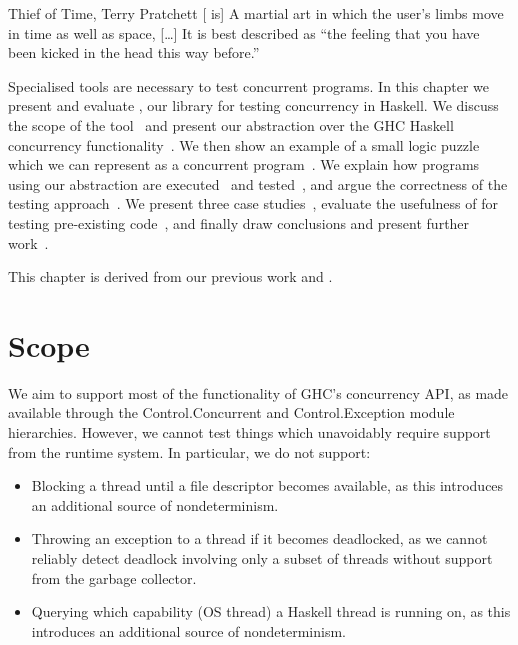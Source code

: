 \begin{bquote}{Thief of Time, Terry Pratchett\nocite{pratchett2001}}
  {[}\dejafu{} is] A martial art in which the user's limbs move in time
  as well as space, [\ldots] It is best described as ``the feeling
  that you have been kicked in the head this way before.''
\end{bquote}

\noindent
Specialised tools are necessary to test concurrent programs.  In this
chapter we present and evaluate \dejafu{}, our library for testing
concurrency in Haskell.  We discuss the scope of the
tool~ and present our abstraction over the GHC
Haskell concurrency functionality~.  We then
show an example of a small logic puzzle which we can represent as a
concurrent program~.  We explain how programs using
our abstraction are executed~ and
tested~, and argue the correctness of the testing
approach~.  We present three case
studies~, evaluate the usefulness of
\dejafu{} for testing pre-existing code~, and
finally draw conclusions and present further
work~.

This chapter is derived from our previous work \cite{YCS-2016-503} and
\cite{walker2015}.

\section{Scope}
\label{sec:dejafu-scope}

We aim to support most of the functionality of GHC’s concurrency API,
as made available through the Control.Concurrent and Control.Exception
module hierarchies.  However, we cannot test things which unavoidably
require support from the runtime system.  In particular, we do not
support:

\begin{itemize}
\item Blocking a thread until a file descriptor becomes available, as this
  introduces an additional source of nondeterminism.
\item Throwing an exception to a thread if it becomes deadlocked, as we cannot
  reliably detect deadlock involving only a subset of threads without support
  from the garbage collector.
\item Querying which capability (OS thread) a Haskell thread is running on, as
  this introduces an additional source of nondeterminism.
\end{itemize}

